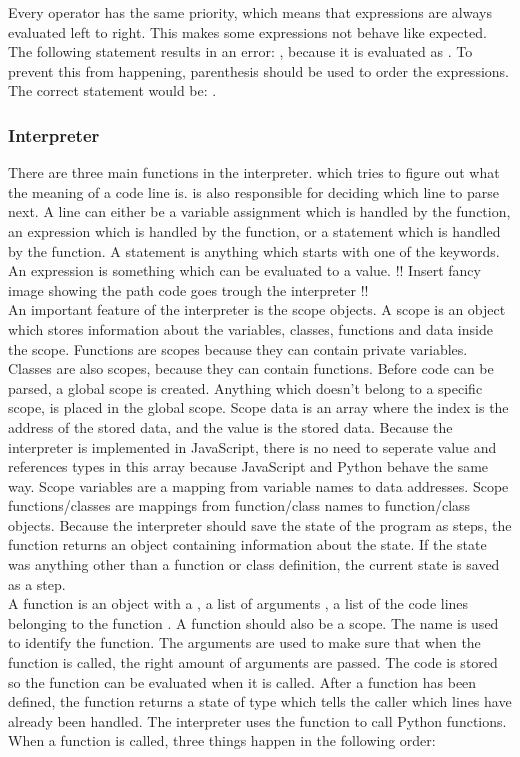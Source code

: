 Every operator has the same priority, which means that expressions are always evaluated left to right. This makes some expressions not behave like expected. The following statement results in an error: , because it is evaluated as . To prevent this from happening, parenthesis should be used to order the expressions. The correct statement would be: .

\subsubsection{Interpreter}
There are three main functions in the interpreter.  which tries to figure out what the meaning of a code line is.  is also responsible for deciding which line to parse next. A line can either be a variable assignment which is handled  by the  function, an expression which is handled by the  function, or a statement which is handled by the  function. A statement is anything which starts with one of the keywords. An expression is something which can be evaluated to a value.
!! Insert fancy image showing the path code goes trough the interpreter !!
\\[11pt]
An important feature of the interpreter is the scope objects. A scope is an object which stores information about the variables, classes, functions and data inside the scope. Functions are scopes because they can contain private variables. Classes are also scopes, because they can contain functions. Before code can be parsed, a global scope is created. Anything which doesn't belong to a specific scope, is placed in the global scope. Scope data is an array where the index is the address of the stored data, and the value is the stored data. Because the interpreter is implemented in JavaScript, there is no need to seperate value and references types in this array because JavaScript and Python behave the same way. Scope variables are a mapping from variable names to data addresses. Scope functions/classes are mappings from function/class names to function/class objects. Because the interpreter should save the state of the program as steps, the  function returns an object containing information about the state. If the state was anything other than a function or class definition, the current state is saved as a step.
\\[11pt]
A function is an object with a , a list of arguments , a list of the code lines belonging to the function . A function should also be a scope. The name is used to identify the function. The arguments are used to make sure that when the function is called, the right amount of arguments are passed. The code is stored so the function can be evaluated when it is called. After a function has been defined, the  function returns a state of type  which tells the caller which lines have already been handled. The interpreter uses the  function to call Python functions. When a function is called, three things happen in the following order:

